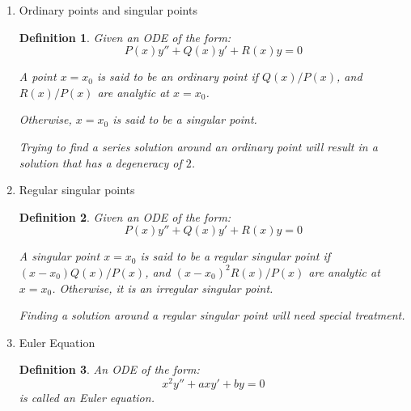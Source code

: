 \documentclass{article}
\newtheorem{definition}{Definition}[section]
\newtheorem{example}{Example}[section]
\begin{document}
\begin{enumerate}
\begin{example}
              Since the series must be zero for all $x$,
              the coefficients of $x^n$ must be zero for all $n$.
              Therefore, we have:
              \begin{eqnarray}
                  \left(
                  (n+1)(n-1)
                  \right)
                  a_n
                  + (n+2) (n+1) a_{n+2}
                  &=& 0, \quad n \geq 0 \\
                  a_{n+2} &=& -\frac{(n+1)(n-1)}{(n+2)(n+1)} a_n \\
                  a_{n+2} &=& -\frac{n-1}{n+2} a_n
              \end{eqnarray}

              And it is clear that the general solution depends on $a_0$ and $a_1$,
              and has a degeneracy of $2$.
          \end{example}
    \item Ordinary points and singular points
          \begin{definition}
              Given an ODE of the form:
              \begin{equation}
                  P(x) y'' + Q(x) y' + R(x) y = 0
              \end{equation}

              A point $x = x_0$ is said to be an ordinary point if
              $Q(x)/P(x)$, and $R(x)/P(x)$ are analytic at $x = x_0$.

              Otherwise, $x = x_0$ is said to be a singular point.

              Trying to find a series solution around an ordinary point
              will result in a solution that has a degeneracy of $2$.
          \end{definition}
    \item Regular singular points
          \begin{definition}
              Given an ODE of the form:
              \begin{equation}
                  P(x) y'' + Q(x) y' + R(x) y = 0
              \end{equation}

              A singular point $x = x_0$ is said to be a regular singular point if
              $(x - x_0) Q(x)/P(x)$, and $(x - x_0)^2 R(x)/P(x)$ are analytic at $x = x_0$.
              Otherwise, it is an irregular singular point.

              Finding a solution around a regular singular point will need special treatment.
          \end{definition}
    \item Euler Equation
          \begin{definition}
              An ODE of the form:
              \begin{equation}
                  x^2 y'' + a x y' + b y = 0
              \end{equation}
              is called an Euler equation.


\end{definition}
\end{enumerate}
\end{document}
